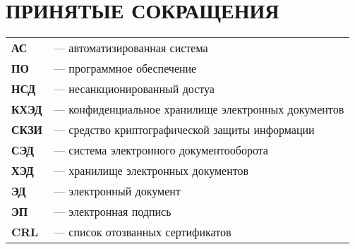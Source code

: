 \chapter*{ПРИНЯТЫЕ СОКРАЩЕНИЯ}
\begin{tabular}{ll}

\textbf{АС} & --- автоматизированная система \\
\textbf{ПО} & --- программное обеспечение \\
\textbf{НСД} & --- несанкционированный достуа \\
\textbf{КХЭД} & --- конфиденциальное хранилище электронных документов \\
\textbf{СКЗИ} & --- средство криптографической защиты информации \\
\textbf{СЭД} & --- система электронного документооборота \\
\textbf{ХЭД} & --- хранилище электронных документов \\
\textbf{ЭД} & --- электронный документ \\
\textbf{ЭП} & --- электронная подпись \\
\textbf{CRL} & --- список отозванных сертификатов  \\
\end{tabular}
\clearpage